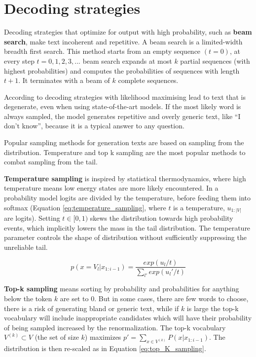 \section{Decoding strategies} \label{decoding_strategies_section}

Decoding strategies that optimize for output with high probability, such as \textbf{beam search}, make text incoherent and repetitive. A beam search is a limited-width breadth first search. This method starts from an empty sequence $(t=0)$, at every step $t=0, 1, 2, 3,...$ beam search expands at most $k$ partial sequences (with highest probabilities) and computes the probabilities of sequences with length $t+1$. It terminates with a beam of $k$ complete sequences. 

According to \cite{holtzman2019curious} decoding strategies with likelihood maximising lead to text that is degenerate, even when using state-of-the-art models. If the most likely word is always sampled, the model generates repetitive and overly generic text, like ``I don't know'', because it is a typical answer to any question.

Popular sampling methods for generation texts are based on sampling from the distribution. Temperature and top k sampling are the most popular methods to combat sampling from the tail.

\textbf{Temperature sampling} is inspired by statistical thermodynamics, where high temperature means low energy states are more likely encountered. In a probability model logits are divided by the temperature, before feeding them into softmax (Equation \ref{eq:temperature_sampling}, where $t$ is a temperature, $u_{1:|V|}$ are logits). Setting $t \in [0,1)$ skews the distribution towards high probability events, which implicitly lowers the mass in the tail distribution. The temperature parameter controls the shape of distribution without sufficiently suppressing the unreliable tail.

\begin{equation} \label{eq:temperature_sampling}
p(x=V_l|x_{1:i-1}) = \frac{exp(u_l / t)}{\sum_{l'} exp(u_l' / t)}
\end{equation}

\textbf{Top-k sampling} means sorting by probability and probabilities for anything below the token $k$ are set to 0. But in some cases, there are few words to choose, there is a risk of generating bland or generic text, while if $k$ is large the top-k vocabulary will include inappropriate candidates which will have their probability of being sampled increased by the renormalization. The top-k vocabulary $V^{(k)} \subset V$ (the set of size $k$) maximizes $p' = \sum_{x \in V^{(k)}} P(x|x_{1:i-1})$. The distribution is then re-scaled as in Equation \ref{eq:top_K_sampling}.

